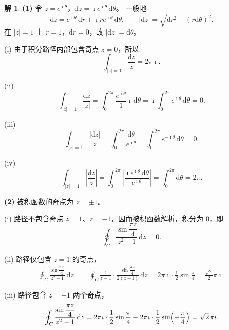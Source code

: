 \documentclass[11pt]{article}
\theoremstyle{remark}
\theoremstyle{definition}
\newtheorem{solution}{解}
\begin{document}
\begin{solution}
\textbf{(1)}
令 $z=e^{\imath\theta}$，$\mathrm{d}z=\imath e^{\imath\theta}\,\mathrm{d}\theta$。
一般地
\[
\mathrm{d}z=e^{\imath\theta}\,\mathrm{d}r+\imath r e^{\imath\theta}\,\mathrm{d}\theta,\qquad
|\mathrm{d}z|=\sqrt{\mathrm{d}r^{2}+(r\mathrm{d}\theta)^{2}}.
\]
在 $|z|=1$ 上 $r=1$，$\mathrm{d}r=0$，故 $|\mathrm{d}z|=\mathrm{d}\theta$。

(i) 由于积分路径内部包含奇点 $z=0$，所以
\[
\int_{|z|=1}\frac{\mathrm{d}z}{z}=2\pi\imath.
\]

(ii)
\[
\int_{|z|=1}\frac{\mathrm{d}z}{|z|}
=\int_{0}^{2\pi}\frac{e^{\imath\theta}}{1}\imath\,\mathrm{d}\theta
=\imath\int_{0}^{2\pi}e^{\imath\theta}\,\mathrm{d}\theta=0.
\]

(iii)
\[
\int_{|z|=1}\frac{|\mathrm{d}z|}{z}
=\int_{0}^{2\pi}\frac{\mathrm{d}\theta}{e^{\imath\theta}}
=\int_{0}^{2\pi}e^{-\imath\theta}\,\mathrm{d}\theta=0.
\]

(iv)
\[
\int_{|z|=1}\left|\frac{\mathrm{d}z}{z}\right|
=\int_{0}^{2\pi}\left|\frac{\imath e^{\imath\theta}\,\mathrm{d}\theta}{e^{\imath\theta}}\right|
=\int_{0}^{2\pi}\mathrm{d}\theta=2\pi.
\]

\medskip
\textbf{(2)}
被积函数的奇点为 $z=\pm 1$。

(i) 路径不包含奇点 $z=1$、$z=-1$，因而被积函数解析，积分为 $0$，即
\[
\oint_{C}\frac{\sin\dfrac{\pi z}{4}}{z^{2}-1}\,\mathrm{d}z=0.
\]

(ii) 路径仅包含 $z=1$ 的奇点，
\begin{align*}
\oint_{C}\frac{\sin\dfrac{\pi z}{4}}{z^{2}-1}\,\mathrm{d}z
&=\oint_{C}\frac{1}{z-1}\cdot\frac{\sin\dfrac{\pi z}{4}}{2(z+1)}\,\mathrm{d}z
=2\pi\imath\cdot\frac12\sin\frac{\pi}{4}
=\frac{\sqrt2}{2}\pi\imath.
\end{align*}

(iii) 路径包含 $z=\pm 1$ 两个奇点，
\[
\oint_{C}\frac{\sin\dfrac{\pi z}{4}}{z^{2}-1}\,\mathrm{d}z
=2\pi\imath\cdot\frac12\sin\frac{\pi}{4}
-2\pi\imath\cdot\frac12\sin\Bigl(-\frac{\pi}{4}\Bigr)
=\sqrt2\,\pi\imath.
\]


\end{solution}
\end{document}
